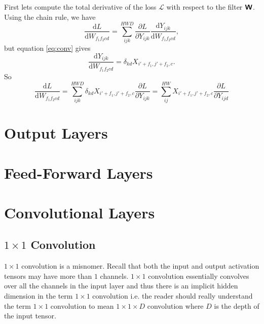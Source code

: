 \documentclass[modern]{aastex61}
\newcommand{\uderivative}{\mathrm{d}}
\begin{document}
First lets compute the total derivative of the loss $\mathscr{L}$ with respect to the filter $\textbf{\textsf{W}}$. Using the chain rule, we have
\begin{equation*}
  \frac{\uderivative L}{\uderivative W_{f_{1}f_{2}cd}} = \sum_{ijk}^{HWD} \frac{\partial L}{\partial Y_{ijk}} \frac{\uderivative Y_{ijk}}{\uderivative W_{f_{1}f_{2}cd}},
\end{equation*}
but equation \eqref{eq:conv} gives
\begin{equation*}
  \frac{\uderivative Y_{ijk}}{\uderivative W_{f_{1}f_{2}cd}} = \delta_{kd} X_{i' + f_{1}, j' + f_{2}, c}.
\end{equation*}
So
\begin{equation*}
  \frac{\uderivative L}{\uderivative W_{f_{1}f_{2}cd}} = \sum_{ijk}^{HWD} \delta_{kd} X_{i' + f_{1}, j' + f_{2}, c} \frac{\partial L}{\partial Y_{ijk}}  = \sum_{ij}^{HW} X_{i' + f_{1}, j' + f_{2}, c} \frac{\partial L}{\partial Y_{ijd}}
\end{equation*}

\section{Output Layers} \label{sec:out}

\section{Feed-Forward Layers} \label{sec:ff}

\section{Convolutional Layers} \label{sec:conv}

\subsection{$1 \times 1$ Convolution} \label{sec:conv11}

$1 \times 1$ convolution is a misnomer. Recall that both the input and output activation tensors may have more than $1$ channels. $1 \times 1$ convolution essentially convolves over all the channels in the input layer and thus there is an implicit hidden dimension in the term $1 \times 1$ convolution i.e. the reader should really understand the term $1 \times 1$ convolution to mean $1 \times 1 \times D$ convolution where $D$ is the depth of the input tensor.
\end{document}
